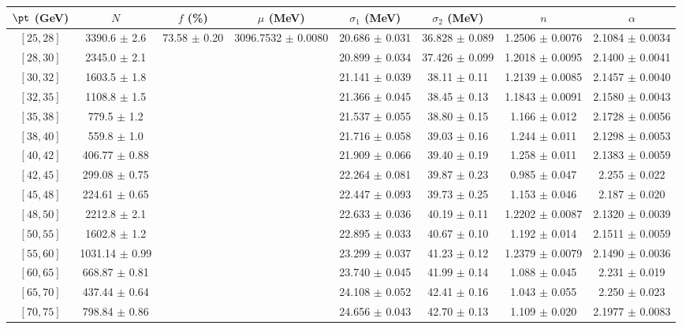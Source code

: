 \begin{tabular}{c||c|c|c|c|c|c|c}
$\pt$ (GeV) & $N$ & $f$ (\%) & $\mu$ (MeV) & $\sigma_1$ (MeV) & $\sigma_2$ (MeV) & $n$ & $\alpha$ \\
\hline
$[25, 28]$ & 3390.6 $\pm$ 2.6 & \multirow{19}{*}{73.58 $\pm$ 0.20} & \multirow{19}{*}{3096.7532 $\pm$ 0.0080} & 20.686 $\pm$ 0.031 & 36.828 $\pm$ 0.089 & 1.2506 $\pm$ 0.0076 & 2.1084 $\pm$ 0.0034\\
$[28, 30]$ & 2345.0 $\pm$ 2.1 &  &  & 20.899 $\pm$ 0.034 & 37.426 $\pm$ 0.099 & 1.2018 $\pm$ 0.0095 & 2.1400 $\pm$ 0.0041\\
$[30, 32]$ & 1603.5 $\pm$ 1.8 &  &  & 21.141 $\pm$ 0.039 & 38.11 $\pm$ 0.11 & 1.2139 $\pm$ 0.0085 & 2.1457 $\pm$ 0.0040\\
$[32, 35]$ & 1108.8 $\pm$ 1.5 &  &  & 21.366 $\pm$ 0.045 & 38.45 $\pm$ 0.13 & 1.1843 $\pm$ 0.0091 & 2.1580 $\pm$ 0.0043\\
$[35, 38]$ & 779.5 $\pm$ 1.2 &  &  & 21.537 $\pm$ 0.055 & 38.80 $\pm$ 0.15 & 1.166 $\pm$ 0.012 & 2.1728 $\pm$ 0.0056\\
$[38, 40]$ & 559.8 $\pm$ 1.0 &  &  & 21.716 $\pm$ 0.058 & 39.03 $\pm$ 0.16 & 1.244 $\pm$ 0.011 & 2.1298 $\pm$ 0.0053\\
$[40, 42]$ & 406.77 $\pm$ 0.88 &  &  & 21.909 $\pm$ 0.066 & 39.40 $\pm$ 0.19 & 1.258 $\pm$ 0.011 & 2.1383 $\pm$ 0.0059\\
$[42, 45]$ & 299.08 $\pm$ 0.75 &  &  & 22.264 $\pm$ 0.081 & 39.87 $\pm$ 0.23 & 0.985 $\pm$ 0.047 & 2.255 $\pm$ 0.022\\
$[45, 48]$ & 224.61 $\pm$ 0.65 &  &  & 22.447 $\pm$ 0.093 & 39.73 $\pm$ 0.25 & 1.153 $\pm$ 0.046 & 2.187 $\pm$ 0.020\\
$[48, 50]$ & 2212.8 $\pm$ 2.1 &  &  & 22.633 $\pm$ 0.036 & 40.19 $\pm$ 0.11 & 1.2202 $\pm$ 0.0087 & 2.1320 $\pm$ 0.0039\\
$[50, 55]$ & 1602.8 $\pm$ 1.2 &  &  & 22.895 $\pm$ 0.033 & 40.67 $\pm$ 0.10 & 1.192 $\pm$ 0.014 & 2.1511 $\pm$ 0.0059\\
$[55, 60]$ & 1031.14 $\pm$ 0.99 &  &  & 23.299 $\pm$ 0.037 & 41.23 $\pm$ 0.12 & 1.2379 $\pm$ 0.0079 & 2.1490 $\pm$ 0.0036\\
$[60, 65]$ & 668.87 $\pm$ 0.81 &  &  & 23.740 $\pm$ 0.045 & 41.99 $\pm$ 0.14 & 1.088 $\pm$ 0.045 & 2.231 $\pm$ 0.019\\
$[65, 70]$ & 437.44 $\pm$ 0.64 &  &  & 24.108 $\pm$ 0.052 & 42.41 $\pm$ 0.16 & 1.043 $\pm$ 0.055 & 2.250 $\pm$ 0.023\\
$[70, 75]$ & 798.84 $\pm$ 0.86 &  &  & 24.656 $\pm$ 0.043 & 42.70 $\pm$ 0.13 & 1.109 $\pm$ 0.020 & 2.1977 $\pm$ 0.0083\\

\end{tabular}
